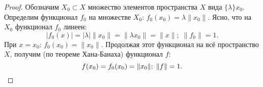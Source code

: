 \documentclass[12pt,a4paper,titlepage,oneside]{book}
\theoremstyle{definition}
\theoremstyle{plain}
\theoremstyle{break}
\theoremstyle{remark}
\theoremstyle{remark}
\theoremstyle{remark}
\theoremstyle{remark}
\theoremstyle{plain}
\theoremstyle{plain}
\begin{document}
\begin{proof}
Обозначим $X_0 \subset X$ множество элементов пространства $X$ вида $\{\lambda\}x_0$. Определим функционал $f_0$ на множестве $X_0$: $f_0(x_0)=\lambda\lVert x_0 \rVert$. Ясно, что на $X_0$ функционал $f_0$ линеен:
\begin{equation*}
\vert f_0(x) \vert = \vert \lambda  \vert \lVert x_0 \rVert=\lVert \lambda x_0 \rVert=\lVert x\rVert; \; \lVert f_0\rVert=1.
\end{equation*}
При $x=x_0$:  $f_0(x_0)=\lVert x_0 \rVert$. Продолжая этот функционал на всё пространство $X$, получим (по теореме Хана-Банаха) функционал $f$:
\begin{equation*}
f(x_0)=f_0(x_0)=\lVert x_0 \rVert; \; \lVert f\rVert=1.
\qedhere
\end{equation*}
\end{proof}
\end{document}
